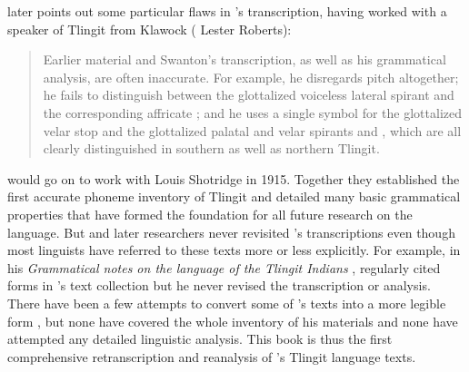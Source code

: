 \citeauthor{velten:1939} later points out some particular flaws in \citeauthor{swanton:1909}’s transcription, having worked with a speaker of Tlingit from Klawock ( Lester Roberts):

\begin{quote}\small
Earlier material and Swanton’s transcription, as well as his grammatical analysis, are often inaccurate.
For example, he disregards pitch altogether; he fails to distinguish between the glottalized voiceless lateral spirant  and the corresponding affricate ; and he uses a single symbol for the glottalized velar stop  and the glottalized palatal and velar spirants  and , which are all clearly distinguished in southern as well as northern Tlingit.
\end{quote}

\citeauthor{boas:1917} would go on to work with  Louis Shotridge in 1915.
Together they established the first accurate phoneme inventory of Tlingit and detailed many basic grammatical properties that have formed the foundation for all future research on the language.
But \citeauthor{boas:1917} and later researchers never revisited \citeauthor{swanton:1909}’s transcriptions even though most linguists have referred to these texts more or less explicitly.
For example, in his \textit{Grammatical notes on the language of the Tlingit Indians} \parencite{boas:1917}, \citeauthor{boas:1917} regularly cited forms in \citeauthor{swanton:1909}’s text collection but he never revised the transcription or analysis.
There have been a few attempts to convert some of \citeauthor{swanton:1909}’s texts into a more legible form \parencites{dauenhauer:1971b}{leer:1977}{littlefield-makinen:2003}, but none have covered the whole inventory of his materials and none have attempted any detailed linguistic analysis.
This book is thus the first comprehensive retranscription and reanalysis of \citeauthor{swanton:1909}’s Tlingit language texts.

